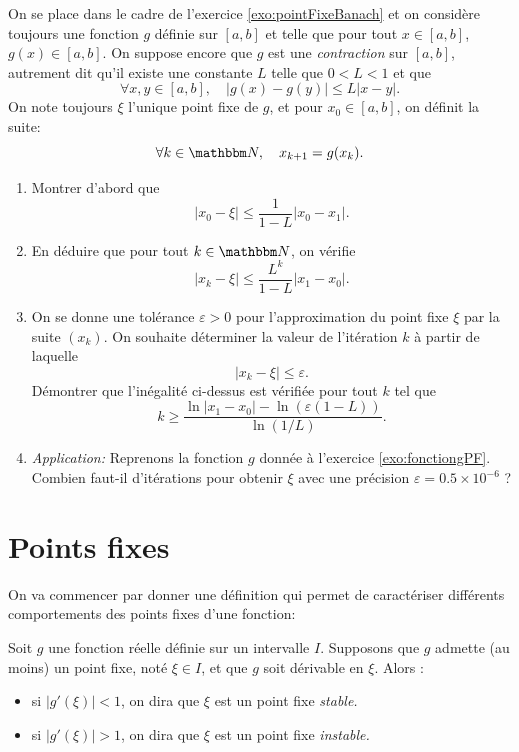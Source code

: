 \begin{exercice}

On se place dans le cadre de l'exercice \ref{exo:pointFixeBanach}
et on considère toujours une fonction $g$ définie sur $[a,b]$ et telle que pour tout $x \in [a,b]$, $g(x) \in [a,b]$.
On suppose encore que $g$ est une \emph{contraction} sur $[a,b]$, autrement dit qu'il existe une constante $L$ telle que $0 < L < 1$ et que
\[
\forall x,y \in [a,b], \quad
| g(x) - g(y) | \leq L | x - y |.
\]
On note toujours $\xi$ l'unique point fixe de $g$, et pour $x_0 \in [a,b]$, on définit la suite:
\[
\forall k \in \eN, \quad x_{k+1} = g(x_k).
\]

\begin{enumerate}
\item Montrer d'abord que 
\[
| x_0 - \xi | \leq \frac1{1-L} | x_0 - x_1 |.
\]

\item En déduire que pour tout $k \in \eN$, on vérifie
\[
| x_k - \xi | \leq \frac{L^k}{1-L} | x_1 - x_0 |.
\]

\item On se donne une tolérance $\varepsilon > 0$ pour l'approximation du point fixe $\xi$ par la suite $(x_k)$. On souhaite déterminer la valeur de l'itération $k$ à partir de laquelle 
\[
| x_k - \xi | \leq \varepsilon.
\]
Démontrer que l'inégalité ci-dessus est vérifiée pour tout $k$ tel que
\[
 k \geq \frac{\ln |x_1 - x_0 | - \ln (\varepsilon(1-L))}{\ln(1/L)}.
\]

\item \emph{Application:} Reprenons la fonction $g$ donnée à l'exercice \ref{exo:fonctiongPF}. Combien faut-il d'itérations pour obtenir $\xi$ avec une précision $\varepsilon = 0.5 \times 10^{-6}$ ?

\end{enumerate}

\end{exercice}

\newpage

\section{Points fixes}

On va commencer par donner une définition qui permet de caractériser différents comportements des points fixes d'une fonction:

\begin{definition}
 Soit $g$ une fonction réelle définie sur un intervalle $I$. Supposons que $g$ admette (au moins) un point fixe, noté $\xi\in I$, et que $g$ soit dérivable en $\xi$. Alors :
 \begin{itemize}
  \item si $|g'(\xi)| < 1$, on dira que $\xi$ est un point fixe \emph{stable.}
  \item si $|g'(\xi)| > 1$, on dira que $\xi$ est un point fixe \emph{instable.}
 \end{itemize}

\end{definition}

